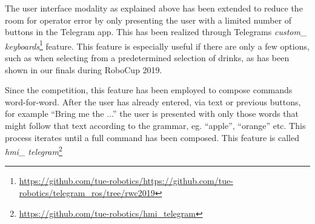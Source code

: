 \label{ssec:keyboard}
\noindent The user interface modality as explained above has been extended to reduce the room for operator error by only presenting the user with a limited number of buttons in the Telegram app. This has been realized through Telegrams \emph{custom\_ keyboards}\footnote{\url{https://github.com/tue-robotics/https://github.com/tue-robotics/telegram_ros/tree/rwc2019}} feature. This feature is especially useful if there are only a few options, such as when selecting from a predetermined selection of drinks, as has been shown in our finals during RoboCup 2019.

Since the competition, this feature has been employed to compose commands word-for-word. After the user has already entered, via text or previous buttons, for example “Bring me the ...” the user is presented with only those words that might follow that text according to the grammar, eg. “apple”, “orange” etc. This process iterates until a full command has been composed. This feature is called \emph{hmi\_ telegram}\footnote{\url{https://github.com/tue-robotics/hmi_telegram}}